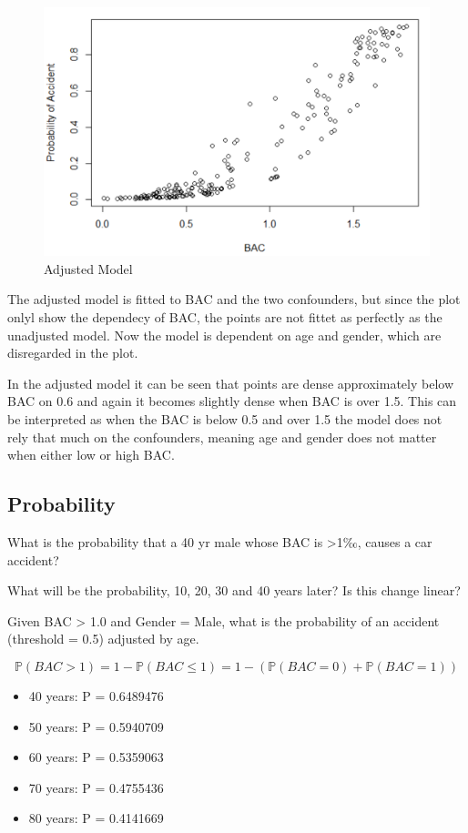 \begin{figure}[H]
    \centering
    \includegraphics[scale=0.5]{adjusted.PNG}
    \caption{Adjusted Model}
    \label{fig:adjusted}
\end{figure}

The adjusted model is fitted to BAC and the two confounders, but since the plot onlyl show the dependecy of BAC, the points are not fittet as perfectly as the unadjusted model. Now the model is dependent on age and gender, which are disregarded in the plot.

In the adjusted model it can be seen that points are dense approximately below BAC on 0.6 and again it becomes slightly dense when BAC is over 1.5. This can be interpreted as when the BAC is below 0.5 and over 1.5 the model does not rely that much on the confounders, meaning age and gender does not matter when either low or high BAC.

\subsection{Probability}

What is the probability that a 40 yr male whose BAC is >1‰, causes a car accident? 

What will be the probability, 10, 20, 30 and 40 years later? Is this change linear?

Given BAC > 1.0 and Gender = Male, what is the probability of an accident (threshold = 0.5) adjusted by age.

$$
\mathbb{P}(BAC > 1) = 1 - \mathbb{P}(BAC \leq 1) = 1 - (\mathbb{P}(BAC = 0) + \mathbb{P}(BAC = 1))
$$

\begin{itemize}
    \item 40 years: P = 0.6489476 
    \item 50 years: P = 0.5940709
    \item 60 years: P = 0.5359063
    \item 70 years: P = 0.4755436 
    \item 80 years: P = 0.4141669 
\end{itemize}

